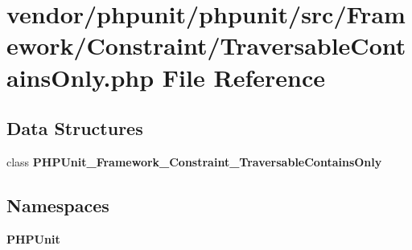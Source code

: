\section{vendor/phpunit/phpunit/src/\+Framework/\+Constraint/\+Traversable\+Contains\+Only.php File Reference}
\label{_traversable_contains_only_8php}
\subsection*{Data Structures}
\begin{DoxyCompactItemize}
\item 
class {\bf P\+H\+P\+Unit\+\_\+\+Framework\+\_\+\+Constraint\+\_\+\+Traversable\+Contains\+Only}
\end{DoxyCompactItemize}
\subsection*{Namespaces}
\begin{DoxyCompactItemize}
\item 
 {\bf P\+H\+P\+Unit}
\end{DoxyCompactItemize}
